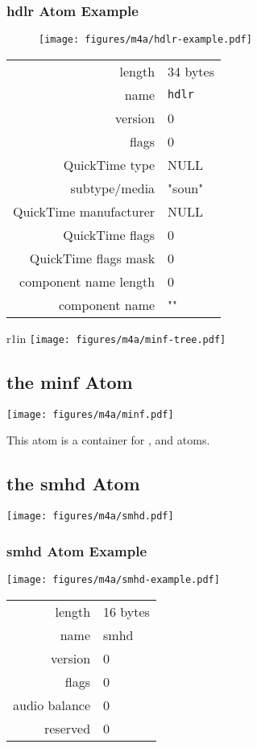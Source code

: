 \subsubsection{hdlr Atom Example}
\begin{figure}[h]
\texttt{[image: figures/m4a/hdlr-example.pdf]}
\end{figure}
\begin{tabular}{rl}
  \textsf{length} & 34 bytes \\
  \textsf{name} & \texttt{hdlr} \\
  \textsf{version} & 0 \\
  \textsf{flags} & 0 \\
  \textsf{QuickTime type} & NULL \\
  \textsf{subtype/media} & \textsf{"soun"} \\
  \textsf{QuickTime manufacturer} & NULL \\
  \textsf{QuickTime flags} & 0 \\
  \textsf{QuickTime flags mask} & 0 \\
  \textsf{component name length} & 0 \\
  \textsf{component name} & \textsf{""} \\
\end{tabular}

\clearpage

\begin{wrapfigure}[5]{r}{1in}
  \texttt{[image: figures/m4a/minf-tree.pdf]}
\end{wrapfigure}
\begin{minipage}[t]{4.75in}
\subsection{the minf Atom}
\label{atom:minf}
\texttt{[image: figures/m4a/minf.pdf]}
\par
\noindent
This atom is a container for \hyperref[atom:smhd]{},
\hyperref[atom:dinf]{} and
\hyperref[atom:stbl]{} atoms.

\subsection{the smhd Atom}
\label{atom:smhd}
\texttt{[image: figures/m4a/smhd.pdf]}

\subsubsection{smhd Atom Example}
\texttt{[image: figures/m4a/smhd-example.pdf]}
\begin{tabular}{rl}
  \textsf{length} & 16 bytes \\
  \textsf{name} & \textsf{smhd} \\
  \textsf{version} & 0 \\
  \textsf{flags} & 0 \\
  \textsf{audio balance} & 0 \\
  \textsf{reserved} & 0 \\
\end{tabular}
\end{minipage}

